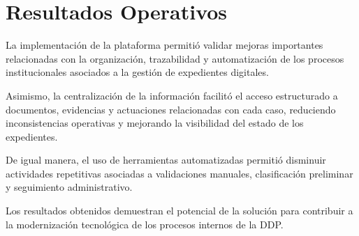 \section{Resultados Operativos}

La implementación de la plataforma permitió validar mejoras importantes relacionadas con la organización, trazabilidad y automatización de los procesos institucionales asociados a la gestión de expedientes digitales.

Asimismo, la centralización de la información facilitó el acceso estructurado a documentos, evidencias y actuaciones relacionadas con cada caso, reduciendo inconsistencias operativas y mejorando la visibilidad del estado de los expedientes.

De igual manera, el uso de herramientas automatizadas permitió disminuir actividades repetitivas asociadas a validaciones manuales, clasificación preliminar y seguimiento administrativo.

Los resultados obtenidos demuestran el potencial de la solución para contribuir a la modernización tecnológica de los procesos internos de la DDP.


